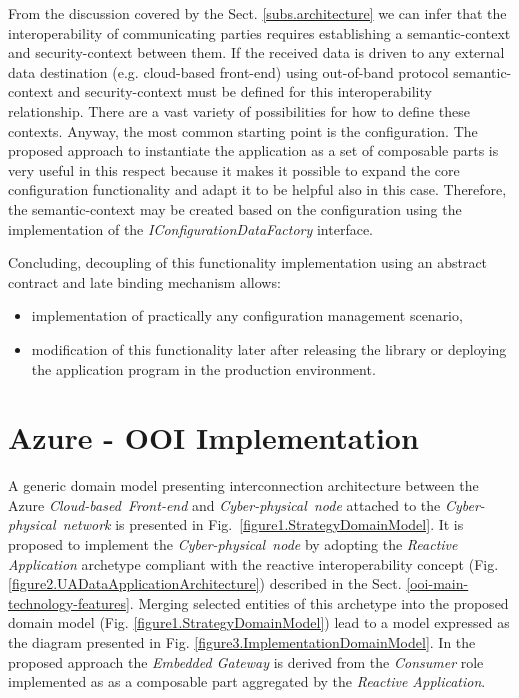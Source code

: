 \documentclass{article}
\begin{document}
From the discussion covered by the Sect. \ref{subs.architecture} we can infer that the interoperability of communicating parties requires establishing a semantic-context and security-context between them. If the received data is driven to any external data destination (e.g. cloud-based front-end) using out-of-band protocol semantic-context and security-context must be defined for this interoperability relationship. There are a vast variety of possibilities for how to define these contexts. Anyway, the most common starting point is the configuration. The proposed approach to instantiate the application as a set of composable parts is very useful in this respect because it makes it possible to expand the core configuration functionality and adapt it to be helpful also in this case. Therefore, the semantic-context may be created based on the configuration using the implementation of the \emph{IConfigurationDataFactory} interface.

Concluding, decoupling of this functionality implementation using an abstract contract and late binding mechanism allows:

\begin{itemize}
      \item implementation of practically any configuration management scenario,
      \item modification of this functionality later after releasing the library or deploying the application program in the production environment.
\end{itemize}

\section{Azure - OOI Implementation}\label{section.gateway-implementation}

A generic domain model presenting interconnection architecture between the Azure \emph{Cloud-based\ Front-end} and \emph{Cyber-physical\ node} attached to the \emph{Cyber-physical\ network} is presented in Fig.~\ref{figure1.StrategyDomainModel}. It is proposed to implement the \emph{Cyber-physical\ node} by adopting the \emph{Reactive Application} archetype compliant with the reactive interoperability concept (Fig. \ref{figure2.UADataApplicationArchitecture}) described in the Sect. \ref{ooi-main-technology-features}. Merging selected entities of this archetype into the proposed domain model (Fig. \ref{figure1.StrategyDomainModel}) lead to a model expressed as the diagram presented in Fig. \ref{figure3.ImplementationDomainModel}. In the proposed approach the \emph{Embedded Gateway} is derived from the \emph{Consumer} role implemented as as a composable part aggregated by the \emph{Reactive Application}.
\end{document}
